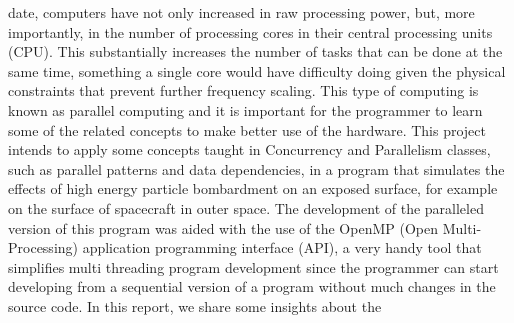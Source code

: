  date, computers have not only increased in raw processing power, but, more importantly, in the number of processing cores in their central processing units (CPU). This substantially increases the number of tasks that can be done at the same time, something a single core would have difficulty doing given the physical constraints that prevent further frequency scaling. This type of computing is known as parallel computing and it is important for the programmer to learn some of the related concepts to make better use of the hardware. This project intends to apply some concepts taught in Concurrency and Parallelism classes, such as parallel patterns and data dependencies, in a program that simulates the effects of high energy particle bombardment on an exposed surface, for example on the surface of spacecraft in outer space. The development of the paralleled version of this program was aided with the use of the OpenMP (Open Multi-Processing) application programming interface (API), a very handy tool that simplifies multi threading program development since the programmer can start developing from a sequential version of a program without much changes in the source code. In this report, we share some insights about the  

